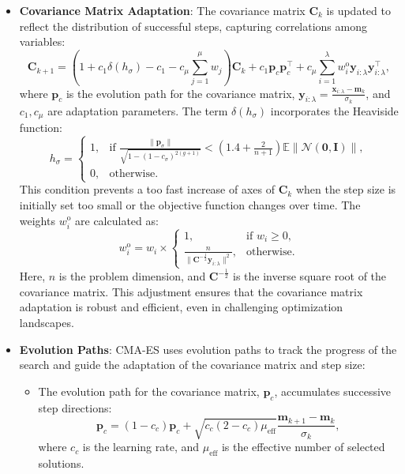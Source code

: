 \begin{itemize}
    \item \textbf{Covariance Matrix Adaptation}: The covariance matrix \(\mathbf{C}_k\) is updated to reflect the distribution of successful steps, capturing correlations among variables:
    \begin{equation}
    \mathbf{C}_{k+1} = (1 + c_1 \delta(h_\sigma) - c_1 - c_\mu \sum_{j=1}^\mu w_j) \mathbf{C}_k + c_1 \mathbf{p}_c \mathbf{p}_c^\top + c_\mu \sum_{i=1}^\lambda w_i^\text{o} \mathbf{y}_{i:\lambda} \mathbf{y}_{i:\lambda}^\top,
    \end{equation}
    where \(\mathbf{p}_c\) is the evolution path for the covariance matrix, \(\mathbf{y}_{i:\lambda} = \frac{\mathbf{x}_{i:\lambda} - \mathbf{m}_k}{\sigma_k}\), and \(c_1, c_\mu\) are adaptation parameters. The term \(\delta(h_\sigma)\) incorporates the Heaviside function:
    \begin{equation}
    h_\sigma = 
    \begin{cases}
    1, & \text{if } \frac{\|\mathbf{p}_\sigma\|}{\sqrt{1 - (1 - c_\sigma)^{2(g+1)}}} < \left(1.4 + \frac{2}{n+1}\right) \mathbb{E}\|\mathcal{N}(\mathbf{0}, \mathbf{I})\|, \\
    0, & \text{otherwise}.
    \end{cases}
    \end{equation}
    This condition prevents a too fast increase of axes of \(\mathbf{C}_k\) when the step size is initially set too small or the objective function changes over time. The weights \(w_i^\text{o}\) are calculated as:  
    \begin{equation}
    w_i^\text{o} = w_i \times 
    \begin{cases} 
    1, & \text{if } w_i \geq 0, \\ 
    \frac{n}{\|\mathbf{C}^{-\frac{1}{2}} \mathbf{y}_{i:\lambda}\|^2}, & \text{otherwise}.
    \end{cases}
    \end{equation}
    Here, \(n\) is the problem dimension, and \(\mathbf{C}^{-\frac{1}{2}}\) is the inverse square root of the covariance matrix. This adjustment ensures that the covariance matrix adaptation is robust and efficient, even in challenging optimization landscapes.

    
    \item \textbf{Evolution Paths}: CMA-ES uses evolution paths to track the progress of the search and guide the adaptation of the covariance matrix and step size:
    \begin{itemize}
        \item The evolution path for the covariance matrix, \(\mathbf{p}_c\), accumulates successive step directions:
        \begin{equation}
        \mathbf{p}_c = (1 - c_c) \mathbf{p}_c + \sqrt{c_c (2 - c_c) \mu_\text{eff}} \frac{\mathbf{m}_{k+1} - \mathbf{m}_k}{\sigma_k},
        \end{equation}
        where \(c_c\) is the learning rate, and \(\mu_\text{eff}\) is the effective number of selected solutions.
        

\end{itemize}
\end{itemize}
